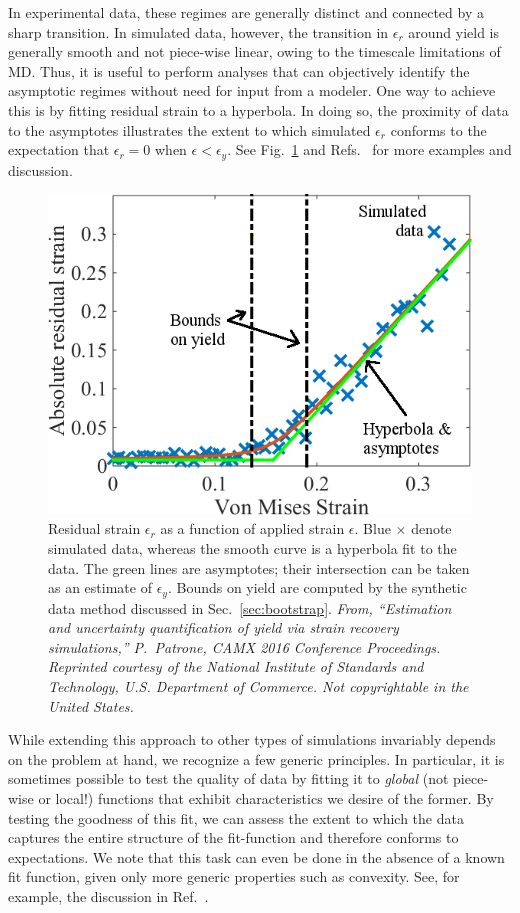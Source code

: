 In experimental data, these regimes are generally distinct and connected by a sharp transition.  In simulated data, however, the transition in $\epsilon_r$ around yield is generally smooth and not piece-wise linear, owing to the timescale limitations of MD.  Thus, it is useful to perform analyses that can objectively identify the asymptotic regimes without need for input from a modeler.  One way to achieve this is by fitting residual strain to a hyperbola.  In doing so, the proximity of data to the asymptotes illustrates the extent to which simulated $\epsilon_r$ conforms to the expectation that $\epsilon_r=0$ when $\epsilon < \epsilon_y$.  See Fig.~\ref{fig:yield} and Refs.~\cite{patrone1,patrone2} for more examples and discussion.

\begin{figure}
  \centering
  \includegraphics[width=0.9\linewidth]{figures/hyperbola.png}
  \caption{Residual strain $\epsilon_r$ as a function of applied strain $\epsilon$.  Blue $\times$ denote simulated data, whereas the smooth curve is a hyperbola fit to the data.  The green lines are asymptotes; their intersection can be taken as an estimate of $\epsilon_y$.    Bounds on yield are computed by the synthetic data method discussed in Sec.~\ref{sec:bootstrap}. {\it From, ``Estimation and uncertainty quantification of yield via strain recovery simulations,'' P.\ Patrone, CAMX 2016 Conference Proceedings.  Reprinted courtesy of the National Institute of Standards and Technology, U.S. Department of Commerce. Not copyrightable in the United States.}}
  \label{fig:yield}
\end{figure}

While extending this approach to other types of simulations invariably depends on the problem at hand, we recognize a few generic principles.  In particular, it is sometimes possible to test the quality of data by fitting it to {\it global} (not piece-wise or local!) functions that exhibit characteristics we desire of the former.  By testing the goodness of this fit, we can assess the extent to which the data captures the entire structure of the fit-function and therefore conforms to expectations.  We note that this task can even be done in the absence of a known fit function, given only more generic properties such as convexity.  See, for example, the discussion in Ref.~\cite{PatroneAIAA}.  


